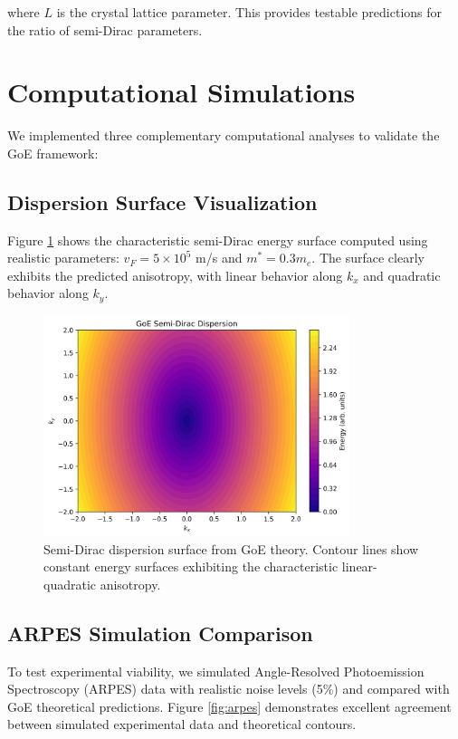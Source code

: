 \documentclass[12pt,a4paper]{article}
\begin{document}
where $L$ is the crystal lattice parameter. This provides testable predictions for the ratio of semi-Dirac parameters.

\section{Computational Simulations}

We implemented three complementary computational analyses to validate the GoE framework:

\subsection{Dispersion Surface Visualization}

Figure \ref{fig:dispersion} shows the characteristic semi-Dirac energy surface computed using realistic parameters: $v_F = 5 \times 10^5$ m/s and $m^* = 0.3 m_e$. The surface clearly exhibits the predicted anisotropy, with linear behavior along $k_x$ and quadratic behavior along $k_y$.

\begin{figure}[H]
\centering
\includegraphics[width=0.8\textwidth]{goe_dispersion.png}
\caption{Semi-Dirac dispersion surface from GoE theory. Contour lines show constant energy surfaces exhibiting the characteristic linear-quadratic anisotropy.}
\label{fig:dispersion}
\end{figure}

\subsection{ARPES Simulation Comparison}

To test experimental viability, we simulated Angle-Resolved Photoemission Spectroscopy (ARPES) data with realistic noise levels (5\%) and compared with GoE theoretical predictions. Figure \ref{fig:arpes} demonstrates excellent agreement between simulated experimental data and theoretical contours.
\end{document}
